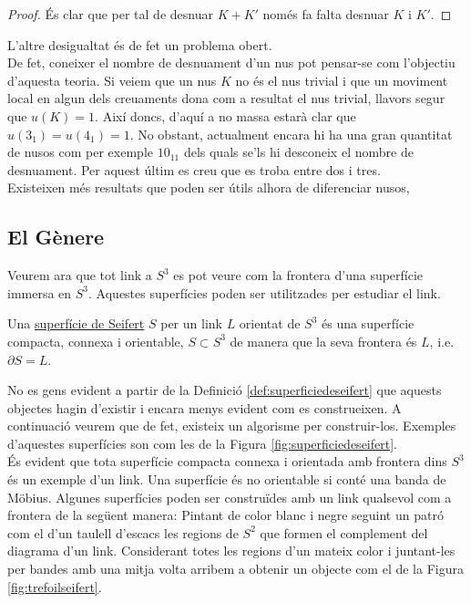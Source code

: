 \begin{proof}
	És clar que per tal de desnuar $K+K'$ només fa falta desnuar $K$ i $K'$.
\end{proof}

L'altre desigualtat és de fet un problema obert.\\

De fet, coneixer el nombre de desnuament d'un nus pot pensar-se com l'objectiu d'aquesta teoria. Si veiem que un nus $K$ no és el nus trivial i que un moviment local en algun dels creuaments dona com a resultat el nus trivial, llavors segur que $u(K)=1$. Així doncs, d'aquí a no massa estarà clar que $u(3_1)=u(4_1)=1$. No obstant, actualment encara hi ha una gran quantitat de nusos com per exemple $10_{11}$ dels quals se'ls hi desconeix el nombre de desnuament. Per aquest últim es creu que es troba entre dos i tres.\\

Existeixen més resultats que poden ser útils alhora de diferenciar nusos, 

\subsection{El Gènere}\label{sec:generescomainvariant}

Veurem ara que tot link a $S^3$ es pot veure com la frontera d'una superfície immersa en $S^3$. Aquestes superfícies poden ser utilitzades per estudiar el link.

\begin{definition}\label{def:superficiedeseifert}
	Una \underline{superfície de Seifert} $S$ per un link $L$ orientat de $S^3$ és una superfície compacta, connexa i orientable, $S\subset S^3$ de manera que la seva frontera és $L$, i.e. $\partial S=L$.
\end{definition}

No es gens evident a partir de la Definició \ref{def:superficiedeseifert} que aquests objectes hagin d'existir i encara menys evident com es construeixen. A continuació veurem que de fet, existeix un algorisme per construir-los. Exemples d'aquestes superfícies son com les de la Figura \ref{fig:superficiedeseifert}. \\

És evident que tota superfície compacta connexa i orientada amb frontera dins $S^3$ és un exemple d'un link. Una superfície és no orientable si conté una banda de Möbius. Algunes superfícies poden ser construïdes amb un link qualsevol com a frontera de la següent manera: Pintant de color blanc i negre seguint un patró com el d'un taulell d'escacs les regions de $S^2$ que formen el complement del diagrama d'un link. Considerant totes les regions d'un mateix color i juntant-les per bandes amb una mitja volta arribem a obtenir un objecte com el de la Figura \ref{fig:trefoilseifert}.\\

